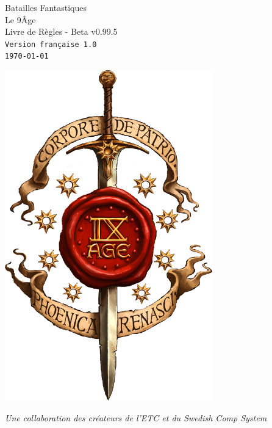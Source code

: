
\begin{titlepage}
\begin{center}


{\fontsize{50}{60}\selectfont Batailles Fantastiques \\ Le 9\ieme Âge} \\
\vspace{0.7cm}
{\fontsize{20}{24}\selectfont Livre de Règles - Beta v0.99.5} \\
\vspace{0.4cm}
{\fontsize{14}{16.8}\selectfont \texttt{Version française 1.0}} \\
{\fontsize{14}{16.8}\selectfont \texttt{\today}} \\

\vfill

\includegraphics[width=9cm]{logo_9th.png}

\vfill

{\fontsize{12}{14.4}\selectfont \textit{Une collaboration des créateurs de l'ETC et du Swedish Comp System}} \\


\end{center}


\end{titlepage}
